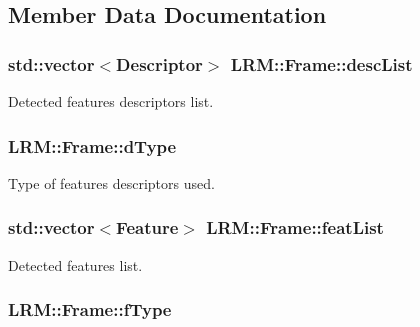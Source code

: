 \subsection{\-Member \-Data \-Documentation}
\hypertarget{classLRM_1_1Frame_ad7f4cd20847b05393d8c0e49e4a07374}{
\subsubsection[{desc\-List}]{\setlength{\rightskip}{0pt plus 5cm}std\-::vector$<${\bf \-Descriptor}$>$ {\bf \-L\-R\-M\-::\-Frame\-::desc\-List}}}\label{classLRM_1_1Frame_ad7f4cd20847b05393d8c0e49e4a07374}


\-Detected features descriptors list. 

\hypertarget{classLRM_1_1Frame_abf992f7a74b18ad8eb8baeab274e2a1b}{
\subsubsection[{d\-Type}]{ {\bf \-L\-R\-M\-::\-Frame\-::d\-Type}}}\label{classLRM_1_1Frame_abf992f7a74b18ad8eb8baeab274e2a1b}


\-Type of features descriptors used. 

\hypertarget{classLRM_1_1Frame_ad52722b8e517f54086604ff8c3d524ad}{
\subsubsection[{feat\-List}]{\setlength{\rightskip}{0pt plus 5cm}std\-::vector$<${\bf \-Feature}$>$ {\bf \-L\-R\-M\-::\-Frame\-::feat\-List}}}\label{classLRM_1_1Frame_ad52722b8e517f54086604ff8c3d524ad}


\-Detected features list. 

\hypertarget{classLRM_1_1Frame_a4984e53e358e726cbf67a55e1cb4f01a}{
\subsubsection[{f\-Type}]{ {\bf \-L\-R\-M\-::\-Frame\-::f\-Type}}}\label{classLRM_1_1Frame_a4984e53e358e726cbf67a55e1cb4f01a}


